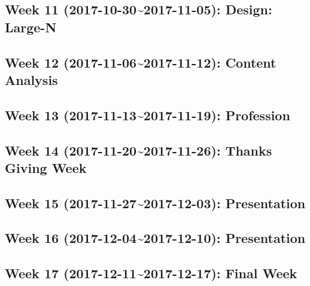 \documentclass[11pt,]{article}
\begin{document}
\subsection{Week 11 (2017-10-30\textasciitilde{}2017-11-05): Design:
Large-N}\label{week-11-2017-10-302017-11-05-design-large-n}

\subsection{Week 12 (2017-11-06\textasciitilde{}2017-11-12): Content
Analysis}\label{week-12-2017-11-062017-11-12-content-analysis}

\subsection{Week 13 (2017-11-13\textasciitilde{}2017-11-19):
Profession}\label{week-13-2017-11-132017-11-19-profession}

\subsection{Week 14 (2017-11-20\textasciitilde{}2017-11-26): Thanks
Giving Week}\label{week-14-2017-11-202017-11-26-thanks-giving-week}

\subsection{Week 15 (2017-11-27\textasciitilde{}2017-12-03):
Presentation}\label{week-15-2017-11-272017-12-03-presentation}

\subsection{Week 16 (2017-12-04\textasciitilde{}2017-12-10):
Presentation}\label{week-16-2017-12-042017-12-10-presentation}

\subsection{Week 17 (2017-12-11\textasciitilde{}2017-12-17): Final
Week}\label{week-17-2017-12-112017-12-17-final-week}
\end{document}
